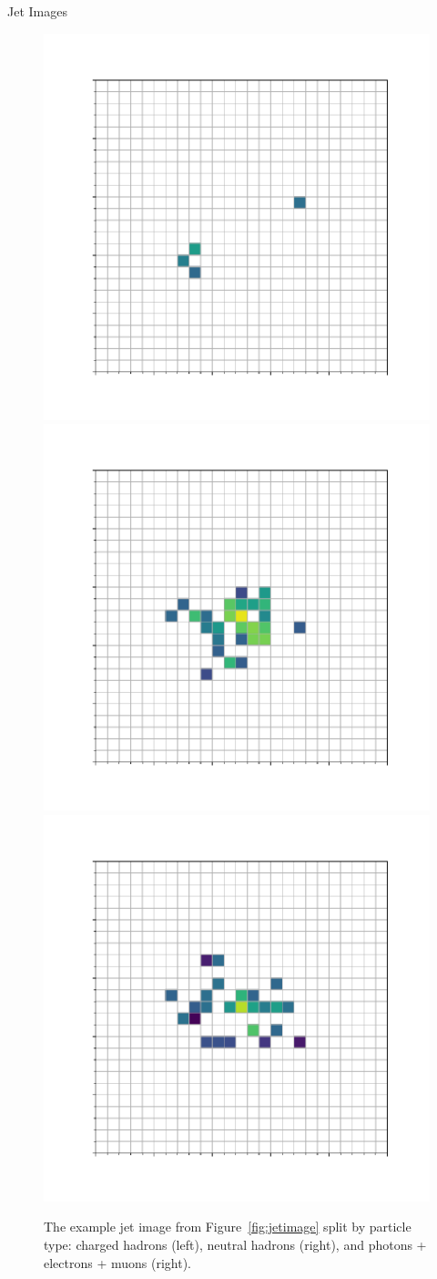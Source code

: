 \begin{section}{Jet Images}
\begin{figure}[tbp!]
\begin{center}
\includegraphics[angle=0,width=0.32\columnwidth]{fig/jetimage_ch.pdf}
\includegraphics[angle=0,width=0.32\columnwidth]{fig/jetimage_nh.pdf}
\includegraphics[angle=0,width=0.32\columnwidth]{fig/jetimage_ph.pdf}
\end{center}
\caption{The example jet image from Figure~\ref{fig:jetimage} split by particle type: charged hadrons (left), neutral hadrons (right), and photons + electrons + muons (right).}
\label{fig:jetimage_split}
\end{figure}


\end{section}
